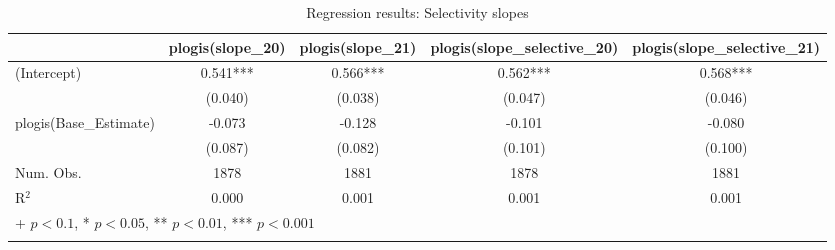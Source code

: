 \begin{table}[htbp]\centering
\caption{Regression results: Selectivity slopes}
\begin{tabular}{lcccc}
\hline
 & \textbf{plogis(slope\_20)} & \textbf{plogis(slope\_21)} & \textbf{plogis(slope\_selective\_20)} & \textbf{plogis(slope\_selective\_21)} \\
\hline
(Intercept) & 0.541*** & 0.566*** & 0.562*** & 0.568*** \\
            & (0.040)  & (0.038)  & (0.047)  & (0.046)  \\
plogis(Base\_Estimate) & -0.073 & -0.128 & -0.101 & -0.080 \\
            & (0.087)  & (0.082)  & (0.101)  & (0.100)  \\
\hline
Num. Obs.   & 1878 & 1881 & 1878 & 1881 \\
R$^2$       & 0.000 & 0.001 & 0.001 & 0.001 \\
\hline
\multicolumn{5}{l}{\footnotesize + $p<0.1$, * $p<0.05$, ** $p<0.01$, *** $p<0.001$} \\
\label{tab:placement_selectivity_table}
\end{tabular}
\end{table}
